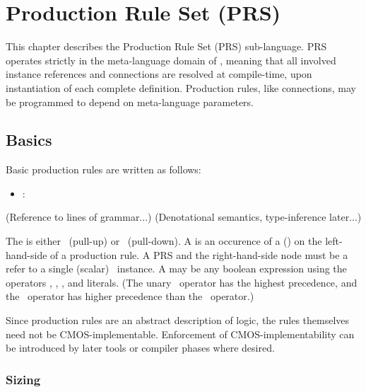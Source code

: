 

\chapter{Production Rule Set (PRS)}
\label{sec:prs}

This chapter describes the Production Rule Set (PRS) sub-language.  
PRS operates strictly in the meta-language domain of \artxx, 
meaning that all involved instance references and connections are resolved
at compile-time, upon instantiation of each complete definition.  
Production rules, like connections, may be programmed to depend
on meta-language parameters.  

\section{Basics}
\label{sec:prs:basics}

Basic production rules are written as follows:

\begin{itemize}
\item {} :  \prsrarrow\  
\end{itemize}

(Reference to lines of grammar...)
(Denotational semantics, type-inference later...)

The  is either \prsup\ (pull-up) or \prsdn\ (pull-down).  
A  is an occurence of a (\bool)  on the
left-hand-side of a production rule.  
A PRS  and the right-hand-side node
must be a refer to a single (scalar) \bool\ instance.  
A  may be any boolean expression using the 
operators \prsnot, \prsand, \prsor, and literals.  
(The unary \prsnot\ operator has the highest precedence, 
and the \prsand\ operator has higher precedence than the \prsor\ operator.)

Since production rules are an abstract description of logic, 
the rules themselves need not be CMOS-implementable.  
Enforcement of CMOS-implementability can be introduced by later tools
or compiler phases where desired.  

\subsection{Sizing}
\label{sec:prs:basics:sizing}


